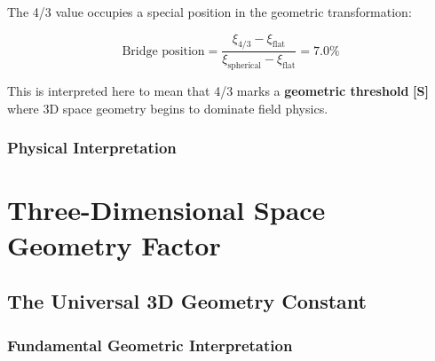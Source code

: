 	The 4/3 value occupies a special position in the geometric transformation:
	
	\begin{equation}
		\text{Bridge position} = \frac{\xi_{4/3} - \xi_{\text{flat}}}{\xi_{\text{spherical}} - \xi_{\text{flat}}} = 7.0\%
		\label{eq:bridge_position}
	\end{equation}
	
	This is interpreted here to mean that 4/3 marks a \textbf{geometric threshold} \textbf{[S]} where 3D space geometry begins to dominate field physics.
	
	\subsubsection{Physical Interpretation}
	\label{subsubsec:physical_interpretation}
	
	\begin{table}[htbp]
		\centering
		\caption{Physical regimes in $\xi$ parameter hierarchy}
		\label{tab:physical_regimes}
	\end{table}
	
	\section{Three-Dimensional Space Geometry Factor}
	\label{sec:3d_geometry_factor}
	
	\subsection{The Universal 3D Geometry Constant}
	\label{subsec:universal_3d_constant}
	
	\subsubsection{Fundamental Geometric Interpretation}
	\label{subsubsec:fundamental_interpretation}
	
